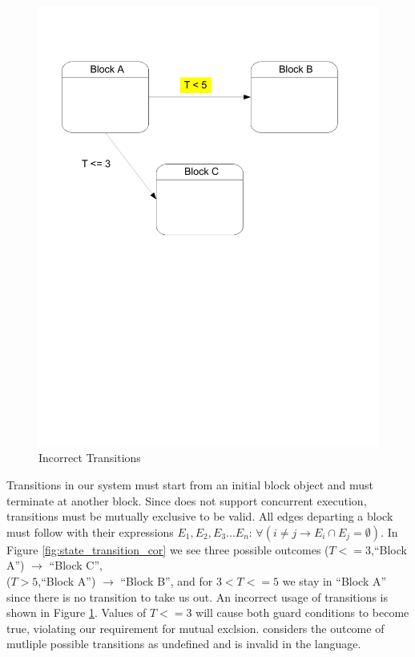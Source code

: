 \begin{figure}[htp]
    \centering
    \includegraphics[trim= 10mm 130mm 20mm 10mm, clip, width=\imgmedphoto]{./images/state_transition_bad.pdf}
    \caption{Incorrect Transitions}
    \label{fig:state_transition_bad}
\end{figure}

Transitions in our system must start from an initial block object and must terminate at another block. Since \emphasize{\plcchart} does not support concurrent execution, transitions must be mutually exclusive to be valid. All edges departing a block must follow with their expressions $E_1, E_2, E_3...E_n$: $\forall(i \neq j \rightarrow E_i \cap E_j = \emptyset)$. In Figure \ref{fig:state_transition_cor} we see three possible outcomes ($T<=3$,``Block A'') $\rightarrow$ ``Block C'',  \\
($T>5$,``Block A'') $\rightarrow$ ``Block B'', and for $3 < T <= 5$ we stay in ``Block A'' since there is no transition to take us out. An incorrect usage of transitions is shown in Figure \ref{fig:state_transition_bad}. Values of $T <= 3$ will cause both guard conditions to become true, violating our requirement for mutual exclsion. \emphasize{\plcchart} considers the outcome of mutliple possible transitions as undefined and is invalid in the language.
